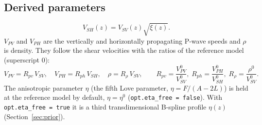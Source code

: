 \documentclass[11pt]{article}
\newcommand{\vsv}{V_{SV}}
\newcommand{\vsh}{V_{SH}}
\newcommand{\vpv}{V_{PV}}
\newcommand{\vph}{V_{PH}}
\begin{document}
\subsection{Derived parameters}\label{sec:derived}
\begin{equation}
  \vsh(z)=\vsv(z)\sqrt{\xi(z)} .
\end{equation}
$\vpv$ and $\vph$ are the vertically and horizontally propagating P-wave
speeds and $\rho$ is density. They follow the shear velocities with the
ratios of the reference model (superscript 0):
\begin{equation}\label{eq:scaling}
  \vpv=R_{pv}\,\vsv,\quad \vph=R_{ph}\,\vsh,\quad \rho=R_\rho\,\vsv,\qquad
  R_{pv}=\frac{\vpv^0}{\vsv^0},\;R_{ph}=\frac{\vph^0}{\vsh^0},\;R_\rho=\frac{\rho^0}{\vsv^0}.
\end{equation}
The anisotropic parameter $\eta$ (the fifth Love parameter,
$\eta=F/(A-2L)$) is held at the reference model by default,
$\eta=\eta^0$ (\texttt{opt.eta\_free = false}). With
\texttt{opt.eta\_free = true} it is a third transdimensional B-spline
profile $\eta(z)$ (Section~\ref{sec:prior}).
\end{document}
